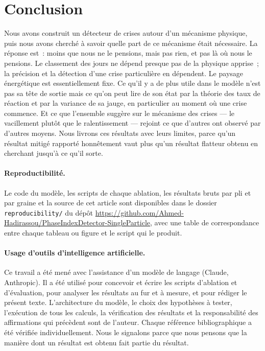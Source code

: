 \documentclass[11pt,a4paper]{article}
\begin{document}
\section{Conclusion}

Nous avons construit un détecteur de crises autour d'un mécanisme physique, puis nous avons cherché à savoir quelle part de ce mécanisme était nécessaire. La réponse est~: moins que nous ne le pensions, mais pas rien, et pas là où nous le pensions. Le classement des jours ne dépend presque pas de la physique apprise~; la précision et la détection d'une crise particulière en dépendent. Le paysage énergétique est essentiellement fixe. Ce qu'il y a de plus utile dans le modèle n'est pas sa tête de sortie mais ce qu'on peut lire de son état par la théorie des taux de réaction et par la variance de sa jauge, en particulier au moment où une crise commence. Et ce que l'ensemble suggère sur le mécanisme des crises --- le vacillement plutôt que le ralentissement --- rejoint ce que d'autres ont observé par d'autres moyens. Nous livrons ces résultats avec leurs limites, parce qu'un résultat mitigé rapporté honnêtement vaut plus qu'un résultat flatteur obtenu en cherchant jusqu'à ce qu'il sorte.

\paragraph{Reproductibilité.} Le code du modèle, les scripts de chaque ablation, les résultats bruts par pli et par graine et la source de cet article sont disponibles dans le dossier \texttt{reproducibility/} du dépôt \url{https://github.com/Ahmed-Hadirassou/PhaseIndexDetector-SingleParticle}, avec une table de correspondance entre chaque tableau ou figure et le script qui le produit.

\paragraph{Usage d'outils d'intelligence artificielle.} Ce travail a été mené avec l'assistance d'un modèle de langage (Claude, Anthropic). Il a été utilisé pour concevoir et écrire les scripts d'ablation et d'évaluation, pour analyser les résultats au fur et à mesure, et pour rédiger le présent texte. L'architecture du modèle, le choix des hypothèses à tester, l'exécution de tous les calculs, la vérification des résultats et la responsabilité des affirmations qui précèdent sont de l'auteur. Chaque référence bibliographique a été vérifiée individuellement. Nous le signalons parce que nous pensons que la manière dont un résultat est obtenu fait partie du résultat.
\end{document}
